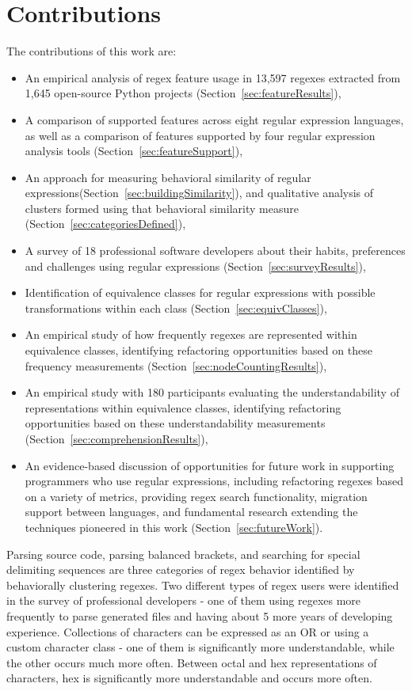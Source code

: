 \section{Contributions}

The contributions of this work are:
\begin{itemize} \setlength \itemsep{.1pt}
    \item An empirical analysis of regex feature usage in 13,597 regexes extracted from 1,645 open-source Python projects (Section~\ref{sec:featureResults}),
    \item A comparison of supported features across eight regular expression languages, as well as a comparison of features supported by four regular expression analysis tools (Section~\ref{sec:featureSupport}),
    \item An approach for measuring behavioral similarity of regular expressions(Section~\ref{sec:buildingSimilarity}), and qualitative analysis of clusters formed using that behavioral similarity measure (Section~\ref{sec:categoriesDefined}),
    \item A survey of 18 professional software developers about their habits, preferences and challenges using regular expressions (Section~\ref{sec:surveyResults}),
    \item Identification of equivalence classes for regular expressions with possible transformations within each class (Section~\ref{sec:equivClasses}),
    \item An empirical study of how frequently regexes are represented within equivalence classes, identifying refactoring opportunities based on these frequency measurements (Section~\ref{sec:nodeCountingResults}),
    \item An empirical study with 180 participants evaluating the understandability of representations within equivalence classes, identifying refactoring opportunities based on these understandability measurements (Section~\ref{sec:comprehensionResults}),
    \item An evidence-based discussion of opportunities for future work in supporting programmers who use regular expressions, including refactoring regexes based on a variety of metrics, providing regex search functionality, migration support between languages, and fundamental research extending the techniques pioneered in this work (Section~\ref{sec:futureWork}).
\end{itemize}

Parsing source code, parsing balanced brackets, and searching for special delimiting sequences are three categories of regex behavior identified by behaviorally clustering regexes.  Two different types of regex users were identified in the survey of professional developers - one of them using regexes more frequently to parse generated files and having about 5 more years of developing experience.  Collections of characters can be expressed as an OR or using a custom character class - one of them is significantly more understandable, while the other occurs much more often. Between octal and hex representations of characters, hex is significantly more understandable and occurs more often.

